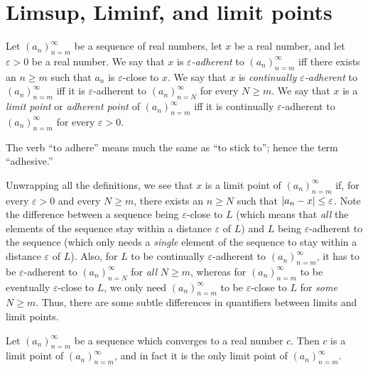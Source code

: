 \section{Limsup, Liminf, and limit points}\label{i:sec:6.4}

\begin{defn}\label{i:6.4.1}
  Let \((a_n)_{n = m}^\infty\) be a sequence of real numbers, let \(x\) be a real number, and let \(\varepsilon > 0\) be a real number.
  We say that \(x\) is \emph{\(\varepsilon\)-adherent} to \((a_n)_{n = m}^\infty\) iff there exists an \(n \geq m\) such that \(a_n\) is \(\varepsilon\)-close to \(x\).
  We say that \(x\) is \emph{continually \(\varepsilon\)-adherent} to \((a_n)_{n = m}^\infty\) iff it is \(\varepsilon\)-adherent to \((a_n)_{n = N}^\infty\) for every \(N \geq m\).
  We say that \(x\) is a \emph{limit point} or \emph{adherent point} of \((a_n)_{n = m}^\infty\) iff it is continually \(\varepsilon\)-adherent to \((a_n)_{n = m}^\infty\) for every \(\varepsilon > 0\).
\end{defn}

\begin{rmk}\label{i:6.4.2}
  The verb ``to adhere'' means much the same as ``to stick to'';
  hence the term ``adhesive.''
\end{rmk}

\begin{note}
  Unwrapping all the definitions, we see that \(x\) is a limit point of \((a_n)_{n = m}^\infty\) if, for every \(\varepsilon > 0\) and every \(N \geq m\), there exists an \(n \geq N\) such that \(\left\lvert a_n - x\right\rvert \leq \varepsilon\).
  Note the difference between a sequence being \(\varepsilon\)-close to \(L\)
  (which means that \emph{all} the elements of the sequence stay within a distance \(\varepsilon\) of \(L\))
  and \(L\) being \(\varepsilon\)-adherent to the sequence
  (which only needs a \emph{single} element of the sequence to stay within a distance \(\varepsilon\) of \(L\)).
  Also, for \(L\) to be continually \(\varepsilon\)-adherent to \((a_n)_{n = m}^\infty\), it has to be \(\varepsilon\)-adherent to \((a_n)_{n = N}^\infty\) for \emph{all} \(N \geq m\), whereas for \((a_n)_{n = m}^\infty\) to be eventually \(\varepsilon\)-close to \(L\), we only need \((a_n)_{n = m}^\infty\) to be \(\varepsilon\)-close to \(L\) for \emph{some} \(N \geq m\).
  Thus, there are some subtle differences in quantifiers between limits and limit points.
\end{note}

\setcounter{thm}{4}
\begin{prop}\label{i:6.4.5}
  Let \((a_n)_{n = m}^\infty\) be a sequence which converges to a real number \(c\).
  Then \(c\) is a limit point of \((a_n)_{n = m}^\infty\), and in fact it is the only limit point of \((a_n)_{n = m}^\infty\).
\end{prop}

